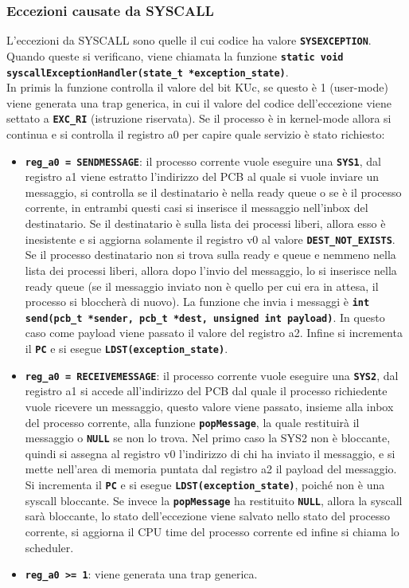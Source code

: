 \documentclass{article}
\begin{document}
\subsubsection{Eccezioni causate da SYSCALL}
L'eccezioni da SYSCALL sono quelle il cui codice ha valore \texttt{\textbf{SYSEXCEPTION}}. Quando queste si verificano, viene chiamata la 
funzione \texttt{\textbf{static void syscallExceptionHandler(state\_t *exception\_state)}}. \\In primis la funzione controlla il valore 
del bit KUc, se questo è 1 (user-mode) viene generata una trap generica, in cui il valore del codice dell'eccezione viene settato a 
\texttt{\textbf{EXC\_RI}} (istruzione riservata).
Se il processo è in kernel-mode allora si continua e si controlla il registro a0 per capire quale servizio è stato richiesto:
\begin{itemize}
  \item \texttt{\textbf{reg\_a0 = SENDMESSAGE}}: il processo corrente vuole eseguire una \texttt{\textbf{SYS1}}, dal registro a1 viene 
    estratto l'indirizzo del PCB al quale si vuole inviare un messaggio, si controlla se il destinatario è nella ready queue o se è il 
    processo corrente, in entrambi questi casi si inserisce il messaggio nell'inbox del destinatario. Se il destinatario è sulla lista dei 
    processi liberi, allora esso è inesistente e si aggiorna solamente il registro v0 al valore \texttt{\textbf{DEST\_NOT\_EXISTS}}. 
    Se il processo destinatario non si trova sulla ready e queue e nemmeno nella lista dei processi liberi, allora dopo l'invio del messaggio,    lo si inserisce nella ready queue (se il messaggio inviato non è quello per cui era in attesa, il processo si bloccherà di nuovo).
    La funzione che invia i messaggi è \texttt{\textbf{int send(pcb\_t *sender, pcb\_t *dest, unsigned int payload)}}. In questo caso come 
    payload viene passato il valore del registro a2. Infine si incrementa il \texttt{\textbf{PC}} e si esegue 
    \texttt{\textbf{LDST(exception\_state)}}.
  \item \texttt{\textbf{reg\_a0 = RECEIVEMESSAGE}}: il processo corrente vuole eseguire una \texttt{\textbf{SYS2}}, dal registro a1 si 
    accede all'indirizzo del PCB dal quale il processo richiedente vuole ricevere un messaggio, questo valore viene passato, insieme
    alla inbox del processo corrente, alla funzione \texttt{\textbf{popMessage}}, la quale restituirà il messaggio o \texttt{\textbf{NULL}} 
    se non lo trova. Nel primo caso la SYS2 non è bloccante, quindi si assegna al registro v0 l'indirizzo di chi ha inviato il messaggio, 
    e si mette nell'area di memoria puntata dal registro a2 il payload del messaggio. Si incrementa il \texttt{\textbf{PC}} e si esegue 
    \texttt{\textbf{LDST(exception\_state)}}, poiché non è una syscall bloccante. Se invece la \texttt{\textbf{popMessage}} ha restituito 
    \texttt{\textbf{NULL}}, allora la syscall sarà bloccante, lo stato dell'eccezione viene salvato nello stato del processo corrente, 
    si aggiorna il CPU time del processo corrente ed infine si chiama lo scheduler. 
  \item \texttt{\textbf{reg\_a0 >= 1}}: viene generata una trap generica.
\end{itemize}
\end{document}
